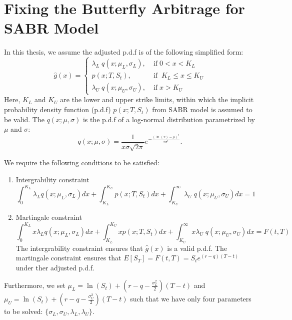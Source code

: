 \documentclass[letterpaper,12pt,titlepage,oneside,final]{book}
\numberwithin{equation}{section}
\theoremstyle{definition}
\begin{document}
\chapter{Fixing the Butterfly Arbitrage for SABR Model}
\label{App:SABR Proof}
In this thesis, we assume the adjusted p.d.f is of the following simplified form:
\begin{equation}
\hat{g}(x)=\left\{ \begin{array}{ll }
\lambda_{L} \;  q(x;\mu_{L},\sigma_{L}), \;&  \text{if} \; 0<x< K_{L}\\
p(x;T,S_t) , \;&  \text{if} \; \;  K_{L} \leq x \leq K_{U}\\
\lambda_{U} \;  q(x;\mu_{U},\sigma_{U}), \;& \text{if} \; x> K_{U}
\end{array} \right.
\label{eq:AppOurFix}
\end{equation}
Here,  $K_{L}$ and $K_{U}$ are the lower and upper strike limits, within which the implicit probability density function (p.d.f) $p(x;T,S_t)$ from SABR model is assumed to be valid. The  $q(x;\mu,\sigma)$ is the p.d.f of a log-normal distribution parametrized by $\mu$ and $\sigma$:
\[
	q(x;\mu,\sigma)=\frac{1}{x\sigma \sqrt{2 \pi}}
	e^{-\frac{(\ln(x)-\mu)^2}{2 \sigma^2}}.
\]

We require the following conditions to be satisfied:
\begin{enumerate}
\item Intergrability constraint
\begin{equation}
\int_{0}^{K_{L}}	\lambda_{L}   q(x;\mu_{L},\sigma_{L}) dx+
\int_{K_{L}}^{K_{U}}	  p(x;T,S_t)  dx+
\int_{K_{U}}^{\infty}	 \lambda_{U} \;  q(x;\mu_{U},\sigma_{U}) dx=1 
\label{eq:AppRND1}
\end{equation}
\item Martingale  constraint
\begin{equation}
\int_{0}^{K_{L}}	 x \lambda_{L}   q(x;\mu_{L},\sigma_{L}) dx+
\int_{K_{L}}^{K_{U}}	  x p(x;T,S_t)  dx+
\int_{K_{U}}^{\infty}	 x \lambda_{U} \;  q(x;\mu_{U},\sigma_{U}) dx=F(t,T)
\label{eq:AppRND2}
\end{equation}
The intergrability constraint ensures that $\hat{g}(x)$ is a valid p.d.f. The martingale  constraint ensures that $E[S_T]=F(t,T)=S_{t}e^{(r-q)(T-t)}$ under ther adjusted p.d.f.
\end{enumerate}
Furthermore, we set $\mu_L=\ln(S_t)+(r-q-\frac{\sigma_L^2}{2})(T-t)$ and $\mu_U=\ln(S_t)+(r-q-\frac{\sigma_U^2}{2})(T-t)$ such that we have only four parameters to be solved: $\{\sigma_{L},\sigma_{U}, \lambda_{L}, \lambda_{U}\}$. 
\end{document}
